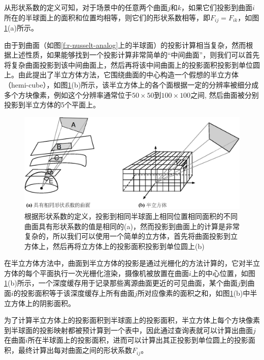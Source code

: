 从形状系数的定义可知，对于场景中的任意两个曲面$j$和$k$，如果它们投影到曲面$i$所在的半球面上的面积和位置均相等，则它们的形状系数相等，即$F_{ij}=F_{ik}$，如图\ref{f:r-hemicube}(a)所示。

由于到曲面（如图\ref{f:r-nusselt-analog}上的半球面）的投影计算相当复杂，然而根据上述性质，如果能够找到一个投影计算非常简单的“中间曲面”，则我们可以首先将复杂曲面投影到该中间曲面上，然后再将该中间曲面上的投影面积投影到单位圆上。由此\cite{a:Thehemi-cube:aradiositysolutionforcomplexenvironments}提出了半立方体方法，它围绕曲面的中心构造一个假想的半立方体（hemi-cube），如图\ref{f:r-hemicube}(b)所示，该半立方体上的各个面根据一定的分辨率被细分成多个方块像素，例如这个分辨率通常位于$50\times 50$到$100\times 100$之间, 然后曲面被分别投影到半立方体的5个平面上。

\begin{figure}
	\includegraphics[width=1.\textwidth]{figures/r/hemi-cube}
	\caption{根据形状系数的定义，投影到相同半球面上相同位置相同面积的不同曲面具有形状系数的值是相同的(a)，然而投影到曲面上的计算是非常复杂的，所以我们可以使用一个简单的立方体，首先将曲面投影到立方体上，然后再将立方体上的投影面积投影到单位圆上(b)}
	\label{f:r-hemicube}
\end{figure}

在半立方体方法中，曲面到半立方体的投影是通过光栅化的方法计算的，它对半立方体的每个平面执行一次光栅化渲染，摄像机被放置在曲面$i$上的中心位置，如图\ref{f:r-hemicube}(b)所示，一个深度缓存用于记录那些离源曲面更近的可见曲面，某个曲面$j$到曲面$i$的投影面积等于该深度缓存上所有曲面$j$所对应像素的面积之和，如图\ref{f:r-hemicube}(b)中半立方体上的阴影面积。

为了计算半立方体上的投影面积到半球面上的投影面积，半立方体上每个方块像素到半球面的投影映射都被预计算到一个表中，因此通过查询表就可以计算出曲面$j$在曲面$i$所在半球面上的投影面积，进而可以计算出其正投影到单位圆上的投影面积，最终计算出每对曲面之间的形状系数$F_{ij}$。




